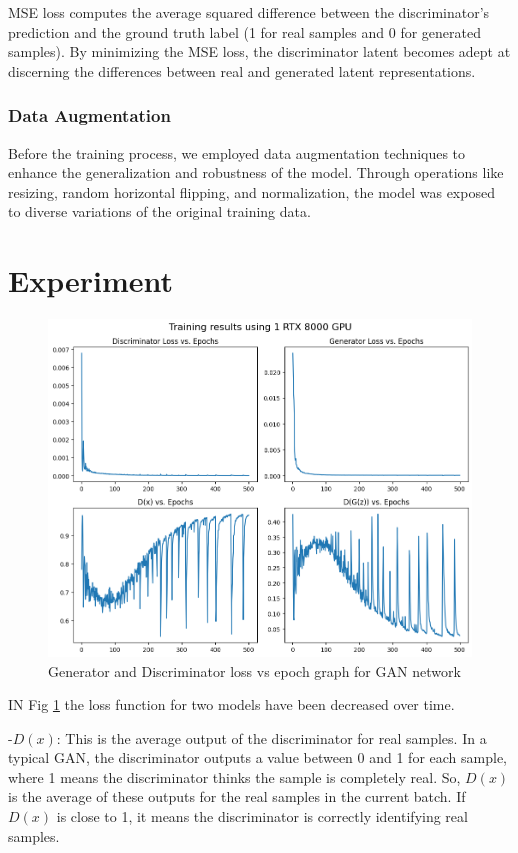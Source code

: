 \documentclass[letterpaper]{article} %
\begin{document}
 MSE loss computes the average squared difference between the discriminator's prediction and the ground truth label (1 for real samples and 0 for generated samples). By minimizing the MSE loss, the discriminator latent becomes adept at discerning the differences between real and generated latent representations.
 
\subsubsection{Data Augmentation}
Before the training process, we employed data augmentation techniques to enhance the generalization and robustness of the model. Through operations like resizing, random horizontal flipping, and normalization, the model was exposed to diverse variations of the original training data. 

\section{Experiment}
\begin{figure}[htbp]
\captionsetup[subfigure]{justification=centering}
  \centering
  \includegraphics[scale = 0.3]{image/loss.png}
  \caption{Generator and Discriminator loss vs epoch graph for GAN network}\label{fig:loss}
\end{figure}

IN Fig \ref{fig:loss} the loss function for two models have been decreased over time. 

-$D(x)$: This is the average output of the discriminator for real samples. In a typical GAN, the discriminator outputs a value between 0 and 1 for each sample, where 1 means the discriminator thinks the sample is completely real. So, $D(x)$ is the average of these outputs for the real samples in the current batch. If $D(x)$ is close to 1, it means the discriminator is correctly identifying real samples.
\end{document}
